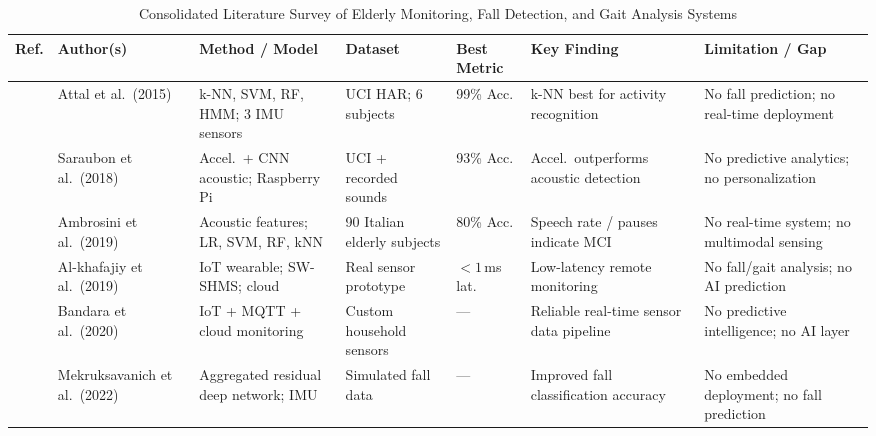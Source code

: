 \documentclass[conference]{IEEEtran}
\begin{document}
\begin{table}[!t]
\caption{Consolidated Literature Survey of Elderly Monitoring, Fall Detection, and Gait Analysis Systems}
\label{tab:litsurvey}
\centering
\scriptsize
\setlength{\tabcolsep}{3pt}
\renewcommand{\arraystretch}{1.2}
\begin{tabular}{C{0.55cm} L{1.6cm} L{2.2cm} L{1.8cm} C{1.0cm} L{2.5cm} L{2.5cm}}
\toprule
\textbf{Ref.} & \textbf{Author(s)} & \textbf{Method / Model} & \textbf{Dataset} & \textbf{Best Metric} & \textbf{Key Finding} & \textbf{Limitation / Gap} \\
\midrule
\cite{attal2015}        & Attal et al.\ (2015)        & k-NN, SVM, RF, HMM; 3 IMU sensors                    & UCI HAR; 6 subjects           & 99\% Acc.         & k-NN best for activity recognition                 & No fall prediction; no real-time deployment            \\
\cite{saraubon2018}     & Saraubon et al.\ (2018)     & Accel.\ + CNN acoustic; Raspberry Pi                  & UCI + recorded sounds         & 93\% Acc.         & Accel.\ outperforms acoustic detection              & No predictive analytics; no personalization            \\
\cite{ambrosini2019}    & Ambrosini et al.\ (2019)    & Acoustic features; LR, SVM, RF, kNN                   & 90 Italian elderly subjects   & 80\% Acc.         & Speech rate / pauses indicate MCI                  & No real-time system; no multimodal sensing             \\
\cite{alkhafajiy2019}   & Al-khafajiy et al.\ (2019) & IoT wearable; SW-SHMS; cloud                          & Real sensor prototype         & ${<}1$\,ms lat.   & Low-latency remote monitoring                      & No fall/gait analysis; no AI prediction                \\
\cite{bandara2020}      & Bandara et al.\ (2020)      & IoT + MQTT + cloud monitoring                          & Custom household sensors      & ---               & Reliable real-time sensor data pipeline            & No predictive intelligence; no AI layer                \\
\cite{mekruksavanich2022} & Mekruksavanich et al.\ (2022) & Aggregated residual deep network; IMU              & Simulated fall data           & ---               & Improved fall classification accuracy              & No embedded deployment; no fall prediction             \\

\end{tabular}
\end{table}
\end{document}
